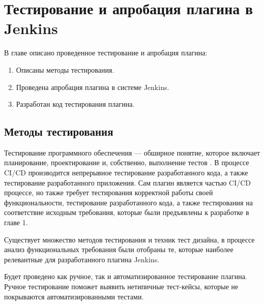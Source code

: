 \chapter{Тестирование и апробация плагина в Jenkins} \label{ch4}


В главе описано проведенное тестирование и апробация плагина:

\begin{enumerate}
	\item Описаны методы тестирования.
	
	\item Проведена апробация плагина в системе Jenkins.
	
	\item Разработан код тестирования плагина.
	
	
	
\end{enumerate}

\section{Методы тестирования} \label{ch4:sec1}

Тестирование программного обеспечения — обширное понятие, которое включает планирование, проектирование и, собственно, выполнение тестов  \cite{testing}. В процессе CI/CD производится непрерывное тестирование разработанного кода, а также тестирование разработанного приложения. Сам плагин является частью CI/CD процессе, но также требует тестирования корректной работы своей функциональности, тестирование разработанного кода, а также тестирования на соответствие исходным требования, которые были предъявлены к разработке в главе 1.

Существует множество методов тестирования и техник тест дизайна, в процессе анализ функциональных требования были отобраны те, которые наиболее релевантные для разработанного плагина Jenkins.

Будет проведено как ручное, так и автоматизированное тестирование плагина. Ручное тестирование поможет выявить нетипичные тест-кейсы, которые не покрываются автоматизированными тестами.

